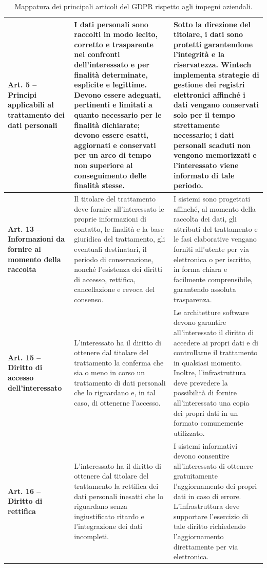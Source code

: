 \begin{longtable}{ >{\raggedright\arraybackslash}p{} p{} p{} }
\bottomrule
\noalign{\vspace{10pt}}
\caption{Mappatura dei principali articoli del GDPR rispetto agli impegni aziendali.}
\label{tab:articoli-gdpr}
\endlastfoot
    \textbf{Art. 5 -- Principi applicabili al trattamento dei dati personali} & I dati personali sono raccolti in modo lecito, corretto e trasparente nei confronti dell'interessato e per finalità determinate, esplicite e legittime. Devono essere adeguati, pertinenti e limitati a quanto necessario per le finalità dichiarate; devono essere esatti, aggiornati e conservati per un arco di tempo non superiore al conseguimento delle finalità stesse. & Sotto la direzione del titolare, i dati sono protetti garantendone l'integrità e la riservatezza. Wintech implementa strategie di gestione dei registri elettronici affinché i dati vengano conservati solo per il tempo strettamente necessario; i dati personali scaduti non vengono memorizzati e l'interessato viene informato di tale periodo.\\ \midrule
    \textbf{Art. 13 -- Informazioni da fornire al momento della raccolta} & Il titolare del trattamento deve fornire all'interessato le proprie informazioni di contatto, le finalità e la base giuridica del trattamento, gli eventuali destinatari, il periodo di conservazione, nonché l'esistenza dei diritti di accesso, rettifica, cancellazione e revoca del consenso. & I sistemi sono progettati affinché, al momento della raccolta dei dati, gli attributi del trattamento e le fasi elaborative vengano forniti all'utente per via elettronica o per iscritto, in forma chiara e facilmente comprensibile, garantendo assoluta trasparenza.\\ \midrule
    \textbf{Art. 15 -- Diritto di accesso dell'interessato} & L'interessato ha il diritto di ottenere dal titolare del trattamento la conferma che sia o meno in corso un trattamento di dati personali che lo riguardano e, in tal caso, di ottenerne l'accesso. & Le architetture software devono garantire all'interessato il diritto di accedere ai propri dati e di controllarne il trattamento in qualsiasi momento. Inoltre, l'infrastruttura deve prevedere la possibilità di fornire all'interessato una copia dei propri dati in un formato comunemente utilizzato.\\ \midrule
    \textbf{Art. 16 -- Diritto di rettifica} & L'interessato ha il diritto di ottenere dal titolare del trattamento la rettifica dei dati personali inesatti che lo riguardano senza ingiustificato ritardo e l'integrazione dei dati incompleti. & I sistemi informativi devono consentire all'interessato di ottenere gratuitamente l'aggiornamento dei propri dati in caso di errore. L'infrastruttura deve supportare l'esercizio di tale diritto richiedendo l'aggiornamento direttamente per via elettronica.\\ \midrule

\end{longtable}
